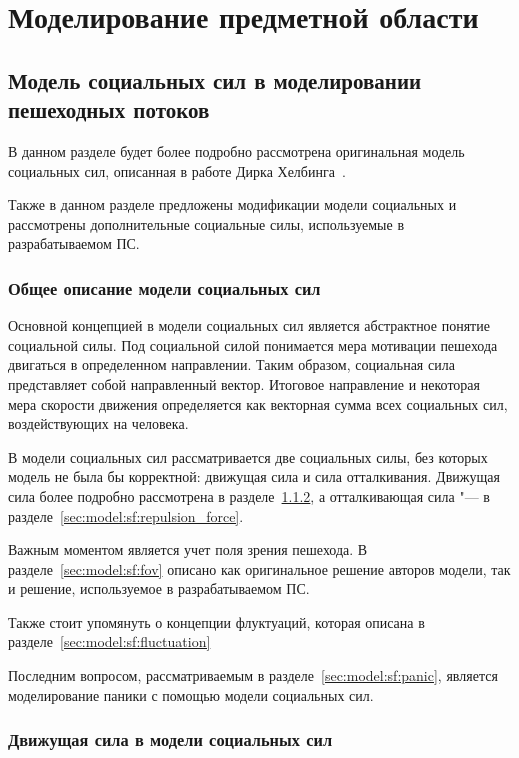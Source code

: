 \section{Моделирование предметной области}
\label{sec:model}

\subsection{Модель социальных сил в моделировании пешеходных потоков}
\label{sec:model:sf}

В данном разделе будет более подробно рассмотрена оригинальная модель социальных сил, описанная в работе Дирка Хелбинга~\cite{helbing_social_force}.

Также в данном разделе предложены модификации модели социальных и рассмотрены дополнительные социальные силы, используемые в разрабатываемом ПС.

\subsubsection{Общее описание модели социальных сил}
\label{sec:model:sf:description}

Основной концепцией в модели социальных сил является абстрактное понятие социальной силы.
Под социальной силой понимается мера мотивации пешехода двигаться в определенном направлении.
Таким образом, социальная сила представляет собой направленный вектор.
Итоговое направление и некоторая мера скорости движения определяется как векторная сумма всех социальных сил, воздействующих на человека.

В модели социальных сил рассматривается две социальных силы, без которых модель не была бы корректной: движущая сила и сила отталкивания.
Движущая сила более подробно рассмотрена в разделе~\ref{sec:model:sf:moving_force}, а отталкивающая сила "--- в разделе~\ref{sec:model:sf:repulsion_force}.

Важным моментом является учет поля зрения пешехода. В разделе~\ref{sec:model:sf:fov} описано как оригинальное решение авторов модели, так и решение, используемое в разрабатываемом ПС.

Также стоит упомянуть о концепции флуктуаций, которая описана в разделе~\ref{sec:model:sf:fluctuation}

Последним вопросом, рассматриваемым в разделе~\ref{sec:model:sf:panic}, является моделирование паники с помощью модели социальных сил.

\subsubsection{Движущая сила в модели социальных сил}
\label{sec:model:sf:moving_force}

